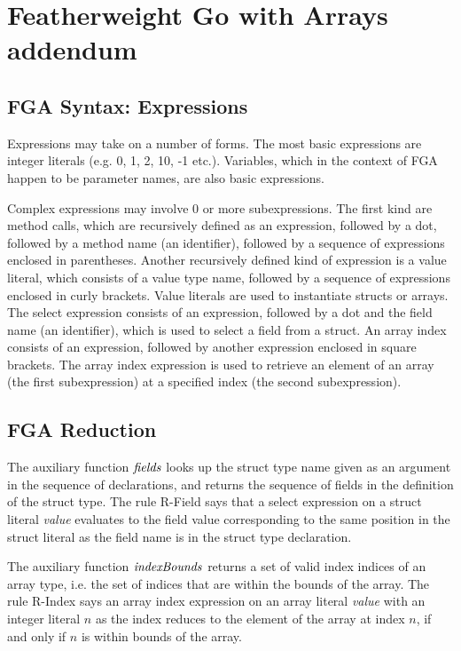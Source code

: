 \section{Featherweight Go with Arrays addendum}

\subsection{FGA Syntax: Expressions}
\label{sec:fg-appx-syntax-expr}

Expressions may take on a number of forms. The most basic expressions
are integer literals (e.g. 0, 1, 2, 10, -1 etc.). Variables, which in the
context of FGA happen to be parameter names, are also basic expressions.

Complex expressions may involve 0 or more subexpressions. The first kind are
method calls, which are recursively defined as an expression, followed by a dot,
followed by a method name (an identifier), followed by a sequence of expressions
enclosed in parentheses. Another recursively defined kind of expression is a
value literal, which consists of a value type name, followed by a sequence of
expressions enclosed in curly brackets. Value literals are used to instantiate
structs or arrays. The select expression consists of an expression, followed by
a dot and the field name (an identifier), which is used to select a field from a
struct. An array index consists of an expression, followed by another expression
enclosed in square brackets. The array index expression is used to retrieve an
element of an array (the first subexpression) at a specified index (the second
subexpression).

\subsection{FGA Reduction}
\label{sec:fg-appx-reduction}

The auxiliary function $\mathit{fields}$ looks up the struct type name given as an
argument in the sequence of declarations, and returns the sequence of fields in
the definition of the struct type. The rule R-Field says that a select
expression on a struct literal \emph{value} evaluates to the field value
corresponding to the same position in the struct literal as the field name is in
the struct type declaration.

The auxiliary function $\mathit{indexBounds}$ returns a set of valid index indices of an
array type, i.e. the set of indices that are within the bounds of the array. The
rule R-Index says an array index expression on an array literal \emph{value}
with an integer literal $n$ as the index reduces to the element of the array at
index $n$, if and only if $n$ is within bounds of the array.

